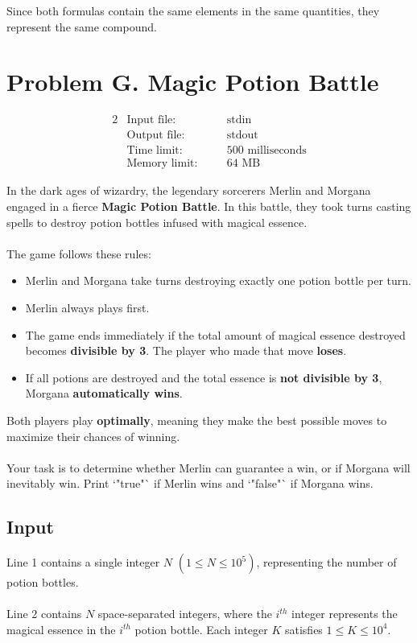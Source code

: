 \documentclass[12pt,a4paper]{article}
\begin{document}
Since both formulas contain the same elements in the same quantities, they represent the same compound.

\newpage

\section*{\fontsize{18}{12} Problem G. Magic Potion Battle}

\begin{alignat*} {2}
 &   \text{Input file:}   \quad     &&\text{stdin}\\
 &   \text{Output file:}  \quad     &&\text{stdout}\\
 &   \text{Time limit:}   \quad     &&\text{500 milliseconds}\\
 &   \text{Memory limit:} \quad     &&\text{64 MB}
\end{alignat*}

\noindent
In the dark ages of wizardry, the legendary sorcerers Merlin and Morgana engaged in a fierce \textbf{Magic Potion Battle}. In this battle, they took turns casting spells to destroy potion bottles infused with magical essence. 
\\\\
\noindent
The game follows these rules:
\begin{itemize}
    \item Merlin and Morgana take turns destroying exactly one potion bottle per turn.
    \item Merlin always plays first.
    \item The game ends immediately if the total amount of magical essence destroyed becomes \textbf{divisible by 3}. The player who made that move \textbf{loses}.
    \item If all potions are destroyed and the total essence is \textbf{not divisible by 3}, Morgana \textbf{automatically wins}.
\end{itemize}

\noindent
Both players play \textbf{optimally}, meaning they make the best possible moves to maximize their chances of winning. 
\\\\
\noindent
Your task is to determine whether Merlin can guarantee a win, or if Morgana will inevitably win. Print `"true"` if Merlin wins and `"false"` if Morgana wins.

\subsection*{\fontsize{16}{12}Input}
Line 1 contains a single integer \( N \) \((1 \leq N \leq 10^5)\), representing the number of potion bottles.
\\\\
\noindent
Line 2 contains \( N \) space-separated integers, where the \( i^{th} \) integer represents the magical essence in the \( i^{th} \) potion bottle. Each integer \( K \) satisfies \( 1 \leq K \leq 10^4 \).
\end{document}

